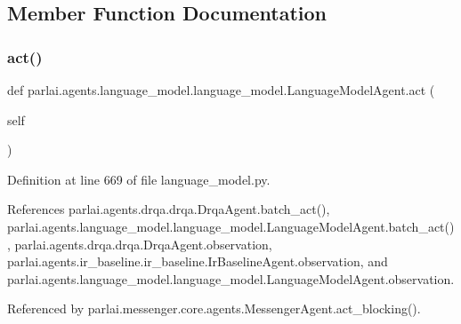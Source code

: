 \subsection{Member Function Documentation}
\mbox{\label{classparlai_1_1agents_1_1language__model_1_1language__model_1_1LanguageModelAgent_a0f8d50e5423b4f34ab5d078d6185e4b2}} 
\subsubsection{\texorpdfstring{act()}{act()}}
{\footnotesize\ttfamily def parlai.\+agents.\+language\+\_\+model.\+language\+\_\+model.\+Language\+Model\+Agent.\+act (\begin{DoxyParamCaption}\item[{}]{self }\end{DoxyParamCaption})}



Definition at line 669 of file language\+\_\+model.\+py.



References parlai.\+agents.\+drqa.\+drqa.\+Drqa\+Agent.\+batch\+\_\+act(), parlai.\+agents.\+language\+\_\+model.\+language\+\_\+model.\+Language\+Model\+Agent.\+batch\+\_\+act(), parlai.\+agents.\+drqa.\+drqa.\+Drqa\+Agent.\+observation, parlai.\+agents.\+ir\+\_\+baseline.\+ir\+\_\+baseline.\+Ir\+Baseline\+Agent.\+observation, and parlai.\+agents.\+language\+\_\+model.\+language\+\_\+model.\+Language\+Model\+Agent.\+observation.



Referenced by parlai.\+messenger.\+core.\+agents.\+Messenger\+Agent.\+act\+\_\+blocking().

